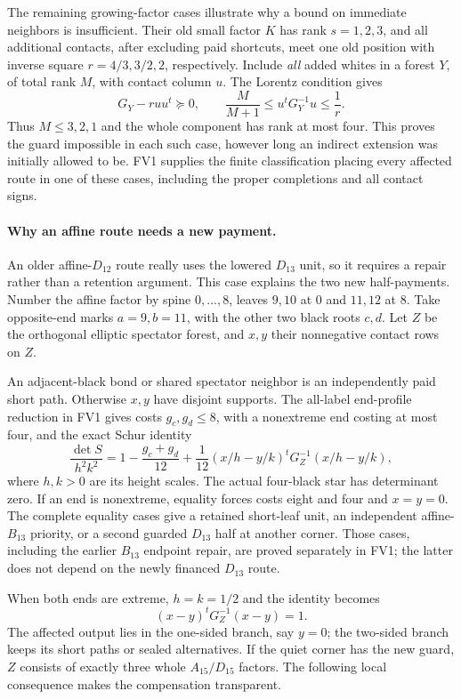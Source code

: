 \documentclass[11pt]{article}
\theoremstyle{remark}\newtheorem{remark}[theorem]{Remark}
\numberwithin{equation}{section}
\begin{document}
The remaining growing-factor cases illustrate why a bound on
immediate neighbors is insufficient. Their old small factor $K$
has rank $s=1,2,3$, and all additional contacts, after excluding
paid shortcuts, meet one old position with inverse square
$r=4/3,3/2,2$, respectively. Include \emph{all} added whites in
a forest $Y$, of total rank $M$, with contact column $u$. The
Lorentz condition gives
\[
 G_Y-r uu^t\succeq0,\qquad
 \frac{M}{M+1}\le u^tG_Y^{-1}u\le\frac1r.
\]
Thus $M\le3,2,1$ and the whole component has rank at most four.
This proves the guard impossible in each such case, however long
an indirect extension was initially allowed to be. FV1 supplies
the finite classification placing every affected route in one of
these cases, including the proper completions and all contact signs.

\paragraph{Why an affine route needs a new payment.}
An older affine-$D_{12}$ route really uses the lowered $D_{13}$
unit, so it requires a repair rather than a retention argument.
This case explains the two new half-payments. Number the affine
factor by spine $0,\ldots,8$, leaves $9,10$ at 0 and $11,12$ at 8.
Take opposite-end marks $a=9,b=11$, with the other two black
roots $c,d$. Let $Z$ be the orthogonal elliptic spectator forest,
and $x,y$ their nonnegative contact rows on $Z$.

An adjacent-black bond or shared spectator neighbor is an
independently paid short path. Otherwise $x,y$ have disjoint
supports. The all-label end-profile reduction in FV1 gives costs
$g_c,g_d\le8$, with a nonextreme end costing at most four, and
the exact Schur identity
\[
 \frac{\det S}{h^2k^2}
 =1-\frac{g_c+g_d}{12}
  +\frac1{12}(x/h-y/k)^tG_Z^{-1}(x/h-y/k),
\]
where $h,k>0$ are its height scales. The actual four-black star
has determinant zero. If an end is nonextreme, equality forces
costs eight and four and $x=y=0$. The complete equality cases
give a retained short-leaf unit, an independent affine-$B_{13}$
priority, or a second guarded $D_{13}$ half at another corner.
Those cases, including the earlier $B_{13}$ endpoint repair, are
proved separately in FV1; the latter does not depend on the
newly financed $D_{13}$ route.

When both ends are extreme, $h=k=1/2$ and the identity becomes
\begin{equation}\label{fv:eq:energyone}
 (x-y)^tG_Z^{-1}(x-y)=1.
\end{equation}
The affected output lies in the one-sided branch, say $y=0$;
the two-sided branch keeps its short paths or sealed alternatives.
If the quiet corner has the new guard, $Z$ consists of exactly
three whole $A_{15}/D_{15}$ factors. The following local consequence
makes the compensation transparent.
\end{document}
